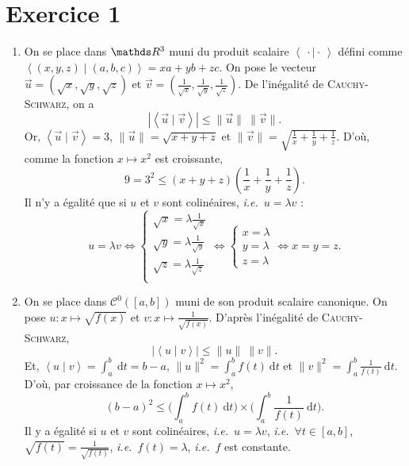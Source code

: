 \section{Exercice 1}

\begin{enumerate}
	\item On se place dans $\R^3$\/ muni du produit scalaire $\left<\:\cdot  \mid \cdot \: \right>$\/ défini comme $\left<(x,y,z) \mid (a,b,c) \right> = xa + yb + zc$. On pose le vecteur $\vec{u} = \left( \sqrt{x},\sqrt{y}, \sqrt{z} \right)$\/ et $\vec{v} = \left( \frac{1}{\sqrt{x}},\frac{1}{\sqrt{y}},\frac{1}{\sqrt{z}} \right)$. De l'inégalité de \textsc{Cauchy-Schwarz}, on a \[
			|\left<\vec{u} \mid \vec{v} \right>| \le \|\vec{u}\|\: \|\vec{v}\|
		.\] Or, $\left<\vec{u} \mid \vec{v} \right> = 3$, $\|\vec{u}\| = \sqrt{x+y+z}$\/ et $\|\vec{v}\| = \sqrt{\frac{1}{x} + \frac{1}{y} + \frac{1}{z}}$. D'où, comme la fonction $x \mapsto x^2$\/ est croissante, \[
			9 = 3^2 \le (x+y+z)\left( \frac{1}{x} + \frac{1}{y} + \frac{1}{z} \right)
		.\]
		Il n'y a égalité que si $u$\/ et $v$\/ sont colinéaires, \textit{i.e.}\ $u = \lambda v$\/ : \[
			u = \lambda v \iff \begin{cases}
				\sqrt{x} = \lambda \frac{1}{\sqrt{x}}\\
				\sqrt{y} = \lambda \frac{1}{\sqrt{y}}\\
				\sqrt{z} = \lambda \frac{1}{\sqrt{z}}\\
			\end{cases} \iff \begin{cases}
				x = \lambda\\
				y = \lambda\\
				z = \lambda
			\end{cases} \iff x = y = z
		.\]
	\item On se place dans $\mathcal{C}^0([a,b])$\/ muni de son produit scalaire canonique. On pose $u : x\mapsto \sqrt{f(x)}$\/ et $v : x \mapsto \frac{1}{\sqrt{f(x)}}$.
		D'après l'inégalité de \textsc{Cauchy-Schwarz}, \[
			|\left<u \mid v \right>| \le \|u\|\: \|v\|
		.\] Et, $\left<u \mid v \right> = \int_{a}^{b}~\mathrm{d}t = b-a$, $\|u\|^2 = \int_{a}^{b} f(t)~\mathrm{d}t$\/ et $\|v\|^2 = \int_{a}^{b} \frac{1}{f(t)} ~\mathrm{d}t$. D'où, par croissance de la fonction $x \mapsto x^2$, \[
		(b-a)^2 \le \Big(\int_{a}^{b} f(t)~\mathrm{d}t \Big) \times \Big(\int_{a}^{b} \frac{1}{f(t)}~\mathrm{d}t\Big)
		.\]
		Il y a égalité si $u$\/ et $v$\/ sont colinéaires, \textit{i.e.}\ $u = \lambda v$, \textit{i.e.}\ $\forall t\in [a,b]$, $\sqrt{f(t)} = \frac{1}{\sqrt{f(t)}}$, \textit{i.e.}\ $f(t) = \lambda$, \textit{i.e.}\ $f$\/ est constante.
\end{enumerate}
